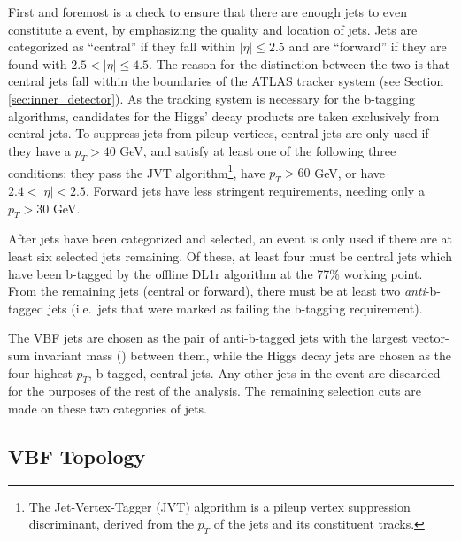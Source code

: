         First and foremost is a check to ensure that there are enough jets to even constitute a \vbfproc event,
            by emphasizing the quality and location of jets.
        Jets are categorized as ``central'' if they fall within $|\eta| \leq 2.5$
            and are ``forward'' if they are found with $ 2.5 < |\eta| \leq 4.5 $.
        The reason for the distinction between the two is that central jets fall within the boundaries of the ATLAS tracker system
            (see Section \ref{sec:inner_detector}).
        As the tracking system is necessary for the b-tagging algorithms,
            candidates for the Higgs' decay products are taken exclusively from central jets.
        To suppress jets from pileup vertices, central jets are only used if they have a $p_T > 40$ GeV,
            and satisfy at least one of the following three conditions:
            they pass the JVT algorithm\footnote{
                The Jet-Vertex-Tagger (JVT) algorithm is a pileup vertex suppression discriminant,
                    derived from the $p_T$ of the jets and its constituent tracks\cite{jvt_algo}.
            }, have $p_T > 60$ GeV, or have $2.4 < |\eta| < 2.5$.
        Forward jets have less stringent requirements, needing only a $p_T > 30$ GeV.

        After jets have been categorized and selected, an event is only used if there are at least six selected jets remaining.
        Of these, at least four must be central jets which have been b-tagged by the offline DL1r algorithm at the 77\% working point.
        From the remaining jets (central or forward), there must be at least two \textit{anti}-b-tagged jets
            (i.e.\ jets that were marked as failing the b-tagging requirement).

        The VBF jets are chosen as the pair of anti-b-tagged jets with the largest vector-sum invariant mass (\mjj) between them,
            while the Higgs decay jets are chosen as the four highest-$p_T$, b-tagged, central jets.
        Any other jets in the event are discarded for the purposes of the rest of the analysis.
        The remaining selection cuts are made on these two categories of jets.
        

    \subsection{VBF Topology}


